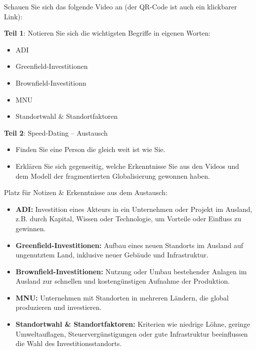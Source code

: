 \begin{myexercise}[ADI]
Schauen Sie sich das folgende Video an (der QR-Code ist auch ein klickbarer Link): 


\textbf{Teil 1}: Notieren Sie sich die wichtigsten Begriffe in eigenen Worten:

\begin{itemize}
\item \gls{ADI}
\item Greenfield-Investitionen
\item Brownfield-Investitionn
\item \gls{MNU}
\item Standortwahl \& Standortfaktoren
\end{itemize}
\textbf{Teil 2}: Speed-Dating – Austausch 

\begin{itemize}
\item Finden Sie eine Person die gleich weit ist wie Sie.
\item Erklären Sie sich gegenseitig, welche Erkenntnisse Sie aus den Videos und dem Modell der fragmentierten Globalisierung gewonnen haben.
\end{itemize}
Platz für Notizen \& Erkenntnisse aus dem Austausch:

\begin{myanswer}
\begin{itemize}
  \item \textbf{\gls{ADI}:}  
  Investition eines Akteurs in ein Unternehmen oder Projekt im Ausland, z.B. durch Kapital, Wissen oder Technologie, um Vorteile oder Einfluss zu gewinnen.

  \item \textbf{Greenfield-Investitionen:}  
  Aufbau eines neuen Standorts im Ausland auf ungenutztem Land, inklusive neuer Gebäude und Infrastruktur.

  \item \textbf{Brownfield-Investitionen:}  
  Nutzung oder Umbau bestehender Anlagen im Ausland zur schnellen und kostengünstigen Aufnahme der Produktion.

  \item \textbf{\gls{MNU}:}  
  Unternehmen mit Standorten in mehreren Ländern, die global produzieren und investieren.

  \item \textbf{Standortwahl \& Standortfaktoren:}  
  Kriterien wie niedrige Löhne, geringe Umweltauflagen, Steuervergünstigungen oder gute Infrastruktur beeinflussen die Wahl des Investitionsstandorts.
\end{itemize}
\end{myanswer}

\end{myexercise}

